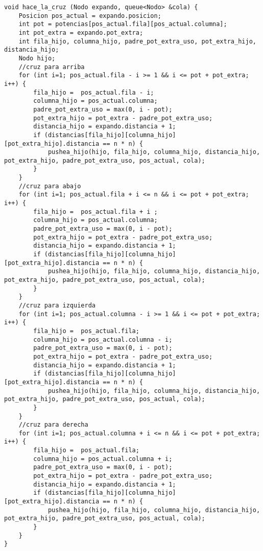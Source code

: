 \documentclass[11pt, a4paper, twoside]{article}
\begin{document}
\begin{lstlisting}
void hace_la_cruz (Nodo expando, queue<Nodo> &cola) {
    Posicion pos_actual = expando.posicion;
    int pot = potencias[pos_actual.fila][pos_actual.columna];
    int pot_extra = expando.pot_extra;
    int fila_hijo, columna_hijo, padre_pot_extra_uso, pot_extra_hijo, distancia_hijo;
    Nodo hijo;
    //cruz para arriba
    for (int i=1; pos_actual.fila - i >= 1 && i <= pot + pot_extra; i++) {
        fila_hijo =  pos_actual.fila - i;
        columna_hijo = pos_actual.columna;
        padre_pot_extra_uso = max(0, i - pot);
        pot_extra_hijo = pot_extra - padre_pot_extra_uso;
        distancia_hijo = expando.distancia + 1;
        if (distancias[fila_hijo][columna_hijo][pot_extra_hijo].distancia == n * n) {
            pushea_hijo(hijo, fila_hijo, columna_hijo, distancia_hijo, pot_extra_hijo, padre_pot_extra_uso, pos_actual, cola);
        }
    }
    //cruz para abajo
    for (int i=1; pos_actual.fila + i <= n && i <= pot + pot_extra; i++) {
        fila_hijo =  pos_actual.fila + i ;
        columna_hijo = pos_actual.columna;
        padre_pot_extra_uso = max(0, i - pot);
        pot_extra_hijo = pot_extra - padre_pot_extra_uso;
        distancia_hijo = expando.distancia + 1;
        if (distancias[fila_hijo][columna_hijo][pot_extra_hijo].distancia == n * n) {
            pushea_hijo(hijo, fila_hijo, columna_hijo, distancia_hijo, pot_extra_hijo, padre_pot_extra_uso, pos_actual, cola);
        }
    }
    //cruz para izquierda
    for (int i=1; pos_actual.columna - i >= 1 && i <= pot + pot_extra; i++) {
        fila_hijo =  pos_actual.fila;
        columna_hijo = pos_actual.columna - i;
        padre_pot_extra_uso = max(0, i - pot);
        pot_extra_hijo = pot_extra - padre_pot_extra_uso;
        distancia_hijo = expando.distancia + 1;
        if (distancias[fila_hijo][columna_hijo][pot_extra_hijo].distancia == n * n) {
            pushea_hijo(hijo, fila_hijo, columna_hijo, distancia_hijo, pot_extra_hijo, padre_pot_extra_uso, pos_actual, cola);
        }
    }
    //cruz para derecha
    for (int i=1; pos_actual.columna + i <= n && i <= pot + pot_extra; i++) {
        fila_hijo =  pos_actual.fila;
        columna_hijo = pos_actual.columna + i;
        padre_pot_extra_uso = max(0, i - pot);
        pot_extra_hijo = pot_extra - padre_pot_extra_uso;
        distancia_hijo = expando.distancia + 1;
        if (distancias[fila_hijo][columna_hijo][pot_extra_hijo].distancia == n * n) {
            pushea_hijo(hijo, fila_hijo, columna_hijo, distancia_hijo, pot_extra_hijo, padre_pot_extra_uso, pos_actual, cola);
        }
    }
}


\end{lstlisting}
\end{document}
